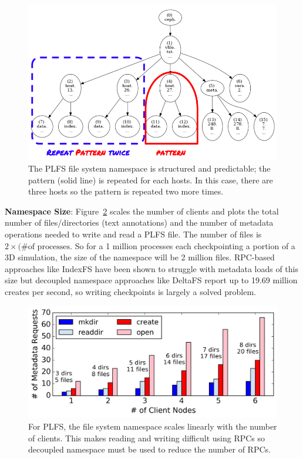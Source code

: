 \begin{figure}[tb]
\centering
  \includegraphics[width=1\linewidth]{figures/tree_plfs.png} 
  \caption{The PLFS file system namespace is structured and predictable; the
  pattern (solid line) is repeated for each hosts. In this case, there are three
  hosts so the pattern is repeated two more times. 
  }\label{fig:tree_plfs}
\end{figure}

\textbf{Namespace Size}: Figure~\ref{fig:plfs_problem} scales the number of
clients and plots the total number of files/directories (text annotations) and
the number of metadata operations needed to write and read a PLFS file.  The
number of files is \(2\times(\text{\# of processes}\).  So for a 1 million processes
each checkpointing a portion of a 3D simulation, the size of the namespace will
be 2 million files.  RPC-based approaches like IndexFS have been shown to
struggle with metadata loads of this size but decoupled namespace approaches
like DeltaFS report up to 19.69 million creates per second, so writing
checkpoints is largely a solved problem.

\begin{figure}[tb]
\centering
  \includegraphics[width=1\linewidth]{figures/plfs_problem.png} 
  \caption{For PLFS, the file system  namespace scales linearly with the number
of clients.  This makes reading and writing difficult using RPCs so decoupled
namespace must be used to reduce the number of RPCs.  }\label{fig:plfs_problem}
\end{figure}

